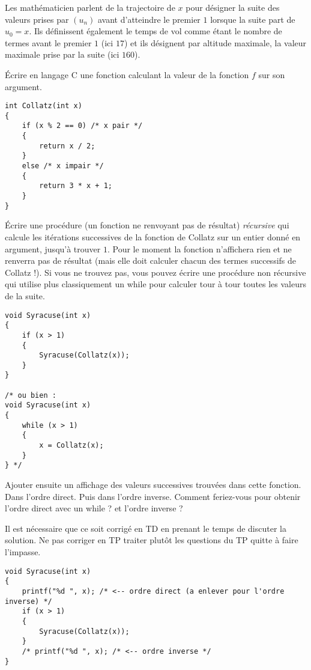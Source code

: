 Les mathématicien parlent de la trajectoire de $x$ pour désigner la
suite des valeurs prises par $(u_n)$ avant d'atteindre le premier $1$
lorsque la suite part de $u_0 = x$.  Ils définissent également le
temps de vol comme étant le nombre de termes avant le premier $1$ (ici
$17$) et ils désignent par altitude maximale, la valeur maximale prise par la suite (ici $160$).

\begin{newenu}
  \item Écrire en langage C une fonction  calculant la valeur de la fonction $f$ sur son argument.
    \begin{correction}
\begin{verbatim}
int Collatz(int x)
{
    if (x % 2 == 0) /* x pair */
    {
        return x / 2;
    }
    else /* x impair */
    {
        return 3 * x + 1;
    }
}
\end{verbatim}
    \end{correction}
\item Écrire une procédure (un fonction ne renvoyant pas de résultat)
  \emph{récursive}  qui calcule les itérations successives
  de la fonction de Collatz sur un entier donné en argument, jusqu'à
  trouver $1$.  Pour le moment la fonction  n'affichera
  rien et ne renverra pas de résultat (mais elle doit calculer chacun
  des termes successifs de Collatz !).  Si vous ne trouvez pas, vous
  pouvez écrire une procédure non récursive qui utilise plus
  classiquement un while pour calculer tour à tour toutes les valeurs
  de la suite.

  \begin{correction}
\begin{verbatim}
void Syracuse(int x)
{
    if (x > 1) 
    {       
        Syracuse(Collatz(x));
    }
}

/* ou bien :
void Syracuse(int x)
{
    while (x > 1) 
    {       
        x = Collatz(x);
    }
} */
\end{verbatim}
  \end{correction}

\item Ajouter ensuite un affichage des valeurs successives trouvées
  dans cette fonction. Dans l'ordre direct. Puis dans l'ordre
  inverse. Comment feriez-vous pour obtenir l'ordre direct avec un
  while ? et l'ordre inverse ?

  \begin{correction}
    Il est nécessaire que ce soit corrigé en TD en prenant le temps de
    discuter la solution. Ne pas corriger en TP traiter plutôt les
    questions du TP quitte à faire l'impasse.
\begin{verbatim}
void Syracuse(int x)
{
    printf("%d ", x); /* <-- ordre direct (a enlever pour l'ordre inverse) */
    if (x > 1) 
    {   
        Syracuse(Collatz(x));
    }
    /* printf("%d ", x); /* <-- ordre inverse */
}
\end{verbatim}
\end{correction}


\end{newenu}
